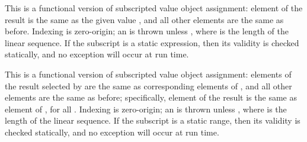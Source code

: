 This is a functional version of subscripted value object assignment:
element  of the result is the same as the given value ,
and all other elements are the same as before.
Indexing is zero-origin; an  is thrown unless ,
where  is the length of the linear sequence.
If the subscript is a static expression, then its validity is checked statically,
and no exception will occur at run time.



This is a functional version of subscripted value object assignment:
elements of the result selected by 
are the same as corresponding elements of , and all other elements are the same as before;
specifically, element  of the result
is the same as element  of , for all .
Indexing is zero-origin; an  is thrown unless ,
where  is the length of the linear sequence.
If the subscript is a static range, then its validity is checked statically,
and no exception will occur at run time.



